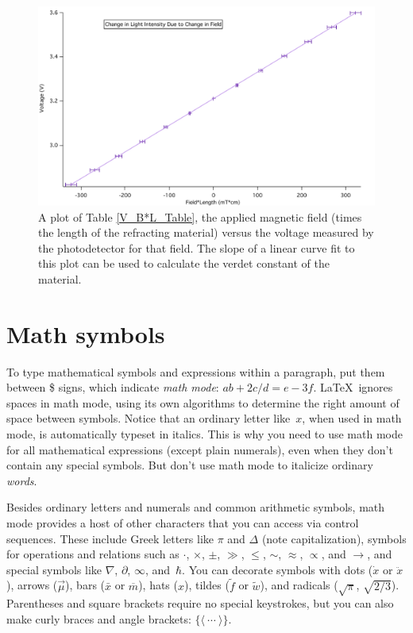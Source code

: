 \documentclass[prb,preprint]{revtex4-1}
\begin{document}
\begin{figure}[h!]
\centering
\includegraphics[width=5in]{V_B-L_Plot.pdf}
\caption{A plot of Table \ref{V_B*L_Table}, the applied magnetic field (times the length of the refracting material) versus the voltage measured by the photodetector for that field. The slope of a linear curve fit to this plot can be used to calculate the verdet constant of the material. }
\label{V_B*L_Plot}
\end{figure}

\section{Math symbols}

To type mathematical symbols and expressions within a paragraph, put
them between \$ signs, which indicate \textit{math mode}: $ab + 2c/d = e-3f$.
\LaTeX\ ignores spaces in math mode, using its own algorithms to determine
the right amount of space between symbols.  Notice that an ordinary letter 
like~$x$, when used in math mode, is automatically typeset in italics. 
This is why you need to use math mode for all mathematical
expressions (except plain numerals), even when they don't contain any 
special symbols.  But don't use math mode to italicize ordinary \textit{words}.

Besides ordinary letters and numerals and common arithmetic symbols, math 
mode provides a host of other characters that you can access via control 
sequences.\cite{wikimathpage} These include Greek letters like $\pi$ and 
$\Delta$ (note capitalization), symbols for operations and relations such 
as $\cdot$, $\times$, $\pm$, $\gg$, $\leq$, $\sim$, $\approx$, $\propto$, 
and $\rightarrow$, and special symbols like $\nabla$, $\partial$, $\infty$, 
and~$\hbar$. You can decorate symbols with dots ($\dot x$ or $\ddot x$), 
arrows ($\vec\mu$), bars ($\bar x$ or $\overline m$), hats ($\hat x$), 
tildes ($\tilde f$ or $\widetilde w$), and radicals ($\sqrt\pi$, $\sqrt{2/3}$).
Parentheses and square brackets require no special keystrokes, but you
can also make curly braces and angle brackets: $\{\langle\ \cdots\ \rangle\}$.
\end{document}
